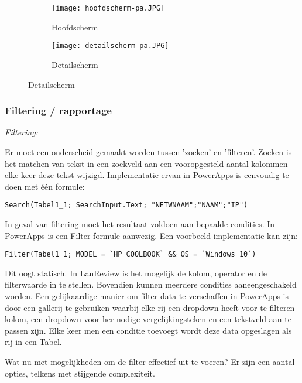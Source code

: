 \begin{figure}[h!]
    \centering
    \begin{subfigure}[b]{\linewidth}
        \texttt{[image: hoofdscherm-pa.JPG]}
        \caption{Hoofdscherm}
    \end{subfigure}
    \begin{subfigure}[b]{\linewidth}
        \texttt{[image: detailscherm-pa.JPG]}
        \caption{Detailscherm}
    \end{subfigure}
    \label{fig:hoofd-detail-pa}
\end{figure}

\subsubsection{Filtering / rapportage}

\textit{Filtering:}

Er moet een onderscheid gemaakt worden tussen 'zoeken' en 'filteren'. Zoeken is het matchen van tekst in een zoekveld aan een vooropgesteld aantal kolommen elke keer deze tekst wijzigd. Implementatie ervan in PowerApps is eenvoudig te doen met één formule:

\begin{lstlisting}
Search(Tabel1_1; SearchInput.Text; "NETWNAAM";"NAAM";"IP")
\end{lstlisting}

In geval van filtering moet het resultaat voldoen aan bepaalde condities. In PowerApps is een Filter formule aanwezig. Een voorbeeld implementatie kan zijn:

\begin{lstlisting}
Filter(Tabel1_1; MODEL = `HP COOLBOOK` && OS = `Windows 10`)
\end{lstlisting}

Dit oogt statisch. In LanReview is het mogelijk de kolom, operator en de filterwaarde in te stellen. Bovendien kunnen meerdere condities aaneengeschakeld worden.
Een gelijkaardige manier om filter data te verschaffen in PowerApps is door een gallerij te gebruiken waarbij elke rij een dropdown heeft voor te filteren kolom, een dropdown voor her nodige vergelijkingsteken en een tekstveld aan te passen zijn. Elke keer men een conditie toevoegt wordt deze data opgeslagen als rij in een Tabel.


Wat nu met mogelijkheden om de filter effectief uit te voeren? Er zijn een aantal opties, telkens met stijgende complexiteit.

